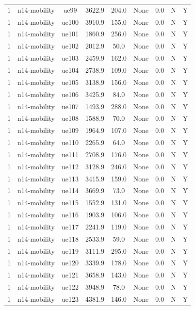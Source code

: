 \begin{table}[ht]
\begin{tabular}{|c|c|c|c|c|c|c|c|c|}
1 & n14-mobility & ue99 & 3622.9 & 204.0 & None & 0.0 & N & Y \\
1 & n14-mobility & ue100 & 3910.9 & 155.0 & None & 0.0 & N & Y \\
1 & n14-mobility & ue101 & 1860.9 & 256.0 & None & 0.0 & N & Y \\
1 & n14-mobility & ue102 & 2012.9 & 50.0 & None & 0.0 & N & Y \\
1 & n14-mobility & ue103 & 2459.9 & 162.0 & None & 0.0 & N & Y \\
1 & n14-mobility & ue104 & 2738.9 & 109.0 & None & 0.0 & N & Y \\
1 & n14-mobility & ue105 & 3138.9 & 156.0 & None & 0.0 & N & Y \\
1 & n14-mobility & ue106 & 3425.9 & 84.0 & None & 0.0 & N & Y \\
1 & n14-mobility & ue107 & 1493.9 & 288.0 & None & 0.0 & N & Y \\
1 & n14-mobility & ue108 & 1588.9 & 70.0 & None & 0.0 & N & Y \\
1 & n14-mobility & ue109 & 1964.9 & 107.0 & None & 0.0 & N & Y \\
1 & n14-mobility & ue110 & 2265.9 & 64.0 & None & 0.0 & N & Y \\
1 & n14-mobility & ue111 & 2708.9 & 176.0 & None & 0.0 & N & Y \\
1 & n14-mobility & ue112 & 3128.9 & 246.0 & None & 0.0 & N & Y \\
1 & n14-mobility & ue113 & 3415.9 & 159.0 & None & 0.0 & N & Y \\
1 & n14-mobility & ue114 & 3669.9 & 73.0 & None & 0.0 & N & Y \\
1 & n14-mobility & ue115 & 1552.9 & 131.0 & None & 0.0 & N & Y \\
1 & n14-mobility & ue116 & 1903.9 & 106.0 & None & 0.0 & N & Y \\
1 & n14-mobility & ue117 & 2241.9 & 119.0 & None & 0.0 & N & Y \\
1 & n14-mobility & ue118 & 2533.9 & 59.0 & None & 0.0 & N & Y \\
1 & n14-mobility & ue119 & 3111.9 & 295.0 & None & 0.0 & N & Y \\
1 & n14-mobility & ue120 & 3339.9 & 178.0 & None & 0.0 & N & Y \\
1 & n14-mobility & ue121 & 3658.9 & 143.0 & None & 0.0 & N & Y \\
1 & n14-mobility & ue122 & 3948.9 & 78.0 & None & 0.0 & N & Y \\
1 & n14-mobility & ue123 & 4381.9 & 146.0 & None & 0.0 & N & Y \\

\end{tabular}
\end{table}
